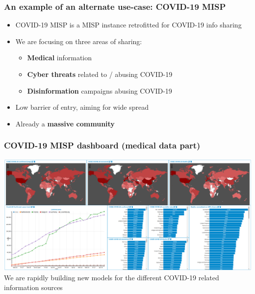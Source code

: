 \begin{frame}
 \frametitle{An example of an alternate use-case: COVID-19 MISP}
 \begin{itemize}
         \item COVID-19 MISP is a MISP instance retrofitted for COVID-19 info sharing
         \item We are focusing on three areas of sharing:
         \begin{itemize}
              \item {\bf Medical} information
              \item {\bf Cyber threats} related to / abusing COVID-19
              \item {\bf Disinformation} campaigns abusing COVID-19
         \end{itemize}
         \item Low barrier of entry, aiming for wide spread
         \item Already a {\bf massive community}
 \end{itemize}
\end{frame}

\begin{frame}
    \frametitle{COVID-19 MISP dashboard (medical data part)}
    \includegraphics[width=1.00\linewidth]{dashboard.png}
    We are rapidly building new models for the different COVID-19 related information sources
\end{frame}

